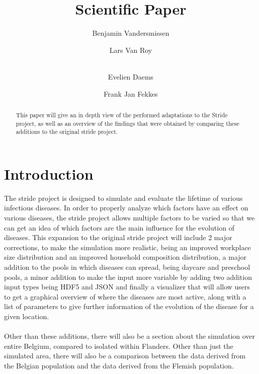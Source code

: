 \documentclass[runningheads]{llncs}
\begin{document}
	\title{Scientific Paper}
	
	\author{Benjamin Vandersmissen \and
		Lars Van Roy \and \\
		Evelien Daems \and
		Frank Jan Fekkes}
	\maketitle              %
	\begin{abstract}
		This paper will give an in depth view of the performed adaptations to the Stride project, as well as an overview of the findings that were obtained by comparing these additions to the original stride project. 
		
		
	\end{abstract}
	
	
	\section{Introduction}
	The stride project is designed to simulate and evaluate the lifetime of various infectious diseases. In order to properly analyze which factors have an effect on various diseases, the stride project allows multiple factors to be varied so that we can get an idea of which factors are the main influence  for the evolution of diseases. This expansion to the original stride project will include 2 major corrections, to make the simulation more realistic, being an improved workplace size distribution and an improved household composition distribution, a major addition to the pools in which diseases can spread, being daycare and preschool pools, a minor addition to make the input more variable by adding two addition input types being HDF5 and JSON and finally a visualizer that will allow users to get a graphical overview of where the diseases are most active, along with a list of parameters to give further information of the evolution of the disease for a given location. \\
	\\
	Other than these additions, there will also be a section about the simulation over entire Belgium, compared to isolated within Flanders. Other than just the simulated area, there will also be a comparison between the data derived from the Belgian population and the data derived from the Flemish population.
	
\end{document}
